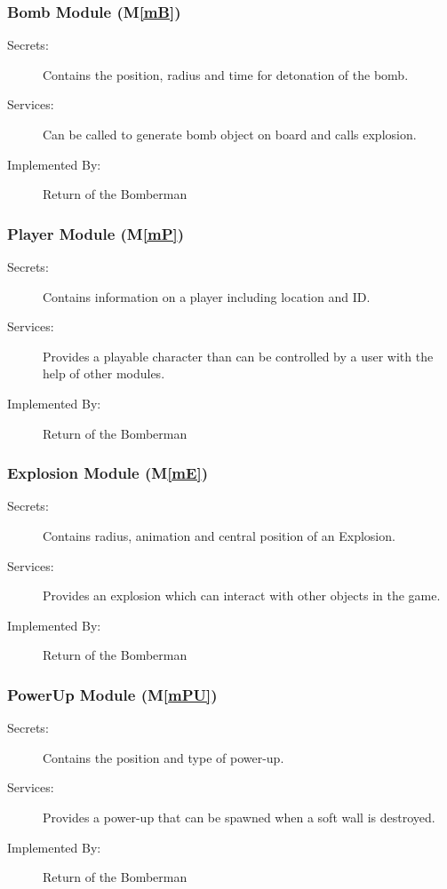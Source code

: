 \documentclass[12pt, titlepage]{article}
\newcommand{\mref}[1]{M\ref{#1}}
\begin{document}
\subsubsection{Bomb Module (\mref{mB})}

\begin{description}
\item[Secrets:]Contains the position, radius and time for detonation of the bomb.
\item[Services:]Can be called to generate bomb object on board and calls explosion.
\item[Implemented By:] Return of the Bomberman
\end{description}

\subsubsection{Player Module (\mref{mP})}

\begin{description}
\item[Secrets:] Contains information on a player including location and ID.
\item[Services:] Provides a playable character than can be controlled by a user with the help of other modules.
\item[Implemented By:] Return of the Bomberman
\end{description}

\subsubsection{Explosion Module (\mref{mE})}

\begin{description}
\item[Secrets:] Contains radius, animation and central position of an Explosion.
\item[Services:] Provides an explosion which can interact with other objects in the game. 
\item[Implemented By:] Return of the Bomberman
\end{description}

\subsubsection{PowerUp Module (\mref{mPU})}

\begin{description}
\item[Secrets:] Contains the position and type of power-up.
\item[Services:] Provides a power-up that can be spawned when a soft wall is destroyed.
\item[Implemented By:] Return of the Bomberman 
\end{description}
\end{document}
